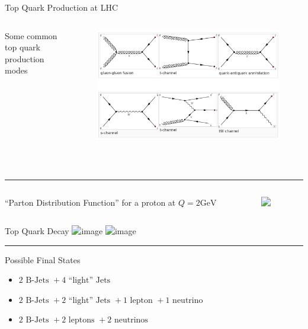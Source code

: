 \documentclass{beamer}
\begin{document}
\begin{frame}{Top Quark Production at LHC}
  \begin{columns}
    \begin{column}{0.3\textwidth}
      Some common top quark production modes
    \end{column}
    \begin{column}{0.7\textwidth}
      \begin{figure}
        \includegraphics[height=0.45\textheight]{figures/Top_Quark_Production.png}
      \end{figure}
    \end{column}
  \end{columns}
  \pause\
  \hrule
  \begin{columns}
    \begin{column}{0.4\textwidth}
      ``Parton Distribution Function'' for a proton at $Q=2\si{\giga\electronvolt}$
    \end{column}
    \begin{column}{0.6\textwidth}
      \begin{figure}
        \includegraphics<2->[height=0.40\textheight]{figures/Parton_Distribution_Functions.png}
      \end{figure}
    \end{column}
  \end{columns}
\end{frame}

\begin{frame}{Top Quark Decay}
  \centering
  \includegraphics<1>[width=0.80\textwidth]{figures/Top_antitop_quark_event.png}
  \includegraphics<2>[width=0.60\textwidth]{figures/Top_antitop_quark_event.png}
  \pause\
  \hrule
  Possible Final States
  \begin{itemize}
    \item $2\text{ B-Jets } + 4\text{ ``light'' Jets }$
    \item $2\text{ B-Jets } + 2\text{ ``light'' Jets } + 1\text{ lepton } + 1\text{ neutrino }$
    \item $2\text{ B-Jets } + 2\text{ leptons } + 2\text{ neutrinos }$
  \end{itemize}
\end{frame}

%     
%     
\end{document}
